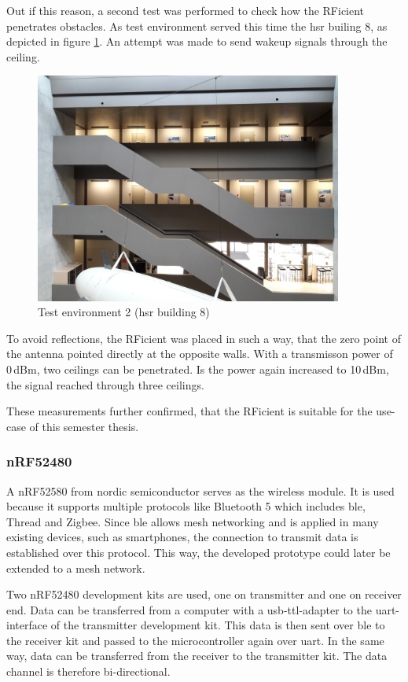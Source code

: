 Out if this reason, a second test was performed to check how the RFicient penetrates obstacles.
As test environment served this time the \acs{hsr} builing 8, as depicted in figure \ref{development:env2}.
An attempt was made to send wakeup signals through the ceiling.
\begin{figure}[ht]
	\centering
	\includegraphics[width=0.9\textwidth]{4-development/hardware/graphics/env2.jpg}
	\caption{Test environment 2 (\acs{hsr} building 8)\label{development:env2}}
\end{figure}
To avoid reflections, the RFicient was placed in such a way, that the zero point of the antenna pointed directly at the opposite walls.
With a transmisson power of 0\,dBm, two ceilings can be penetrated.
Is the power again increased to 10\,dBm, the signal reached through three ceilings.

These measurements further confirmed, that the RFicient is suitable for the use-case of this semester thesis.

\subsubsection{nRF52480}
A nRF52580 from nordic semiconductor serves as the wireless module.
It is used because it supports multiple protocols like Bluetooth 5 which includes \acf{ble}, Thread and Zigbee\cite{nrfpb}.
Since \acs{ble} allows mesh networking and is applied in many existing devices, such as smartphones, the connection to transmit data is established over this protocol.
This way, the developed prototype could later be extended to a mesh network.

Two nRF52480 development kits are used, one on transmitter and one on receiver end.
Data can be transferred from a computer with a \acs{usb}-\acs{ttl}-adapter to the \acs{uart}-interface of the transmitter development kit.
This data is then sent over \acs{ble} to the receiver kit and passed to the microcontroller again over \acs{uart}.
In the same way, data can be transferred from the receiver to the transmitter kit.
The data channel is therefore bi-directional. 


